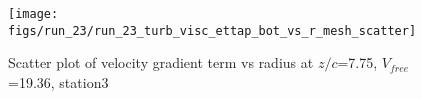 \begin{figure}[H]
\centering
\texttt{[image: figs/run\_23/run\_23\_turb\_visc\_ettap\_bot\_vs\_r\_mesh\_scatter]}
\caption{Scatter plot of velocity gradient term vs radius at $z/c$=7.75, $V_{free}$=19.36, station3}
\label{fig:run_23_turb_visc_ettap_bot_vs_r_mesh_scatter}
\end{figure}


